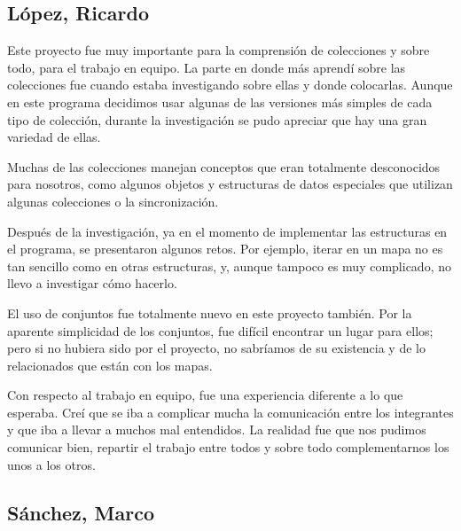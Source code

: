 \documentclass[11pt]{article}
\begin{document}
\subsection{López, Ricardo}

\par

Este proyecto fue muy importante para la comprensión de colecciones y 
sobre todo, para el trabajo en equipo. La parte en donde más aprendí 
sobre las colecciones fue cuando estaba investigando sobre ellas y 
donde colocarlas. Aunque en este programa decidimos usar algunas de 
las versiones más simples de cada tipo de colección, durante la 
investigación se pudo apreciar que hay una gran variedad de ellas.

\par

Muchas de las colecciones manejan conceptos que eran totalmente 
desconocidos para nosotros, como algunos objetos y estructuras de 
datos especiales que utilizan algunas colecciones o la 
sincronización.

\par

Después de la investigación, ya en el momento de implementar las 
estructuras en el programa, se presentaron algunos retos. Por 
ejemplo, iterar en un mapa no es tan sencillo como en otras 
estructuras, y, aunque tampoco es muy complicado, no llevo a 
investigar cómo hacerlo.

\par

El uso de conjuntos fue totalmente nuevo en este proyecto también. 
Por la aparente simplicidad de los conjuntos, fue difícil encontrar un lugar 
para ellos; pero si no hubiera sido por el proyecto, no sabríamos de 
su existencia y de lo relacionados que están con los mapas.

\par

Con respecto al trabajo en equipo, fue una experiencia diferente a lo 
que esperaba. Creí que se iba a complicar mucha la comunicación entre 
los integrantes y que iba a llevar a muchos mal entendidos. La 
realidad fue que nos pudimos comunicar bien, repartir el trabajo 
entre todos y sobre todo complementarnos los unos a los otros. 

\subsection{Sánchez, Marco}

\par
\end{document}
